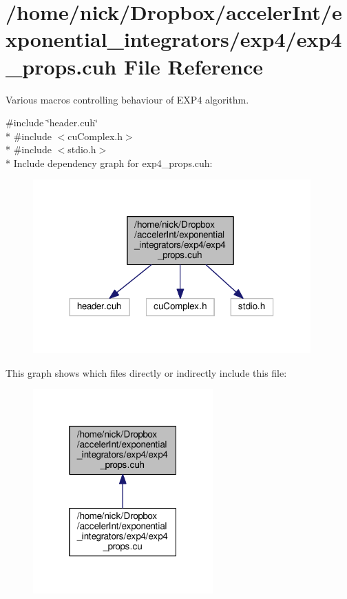 \hypertarget{exp4__props_8cuh}{}\section{/home/nick/\+Dropbox/acceler\+Int/exponential\+\_\+integrators/exp4/exp4\+\_\+props.cuh File Reference}
\label{exp4__props_8cuh}


Various macros controlling behaviour of E\+X\+P4 algorithm.  


{\ttfamily \#include \char`\"{}header.\+cuh\char`\"{}}\\*
{\ttfamily \#include $<$cu\+Complex.\+h$>$}\\*
{\ttfamily \#include $<$stdio.\+h$>$}\\*
Include dependency graph for exp4\+\_\+props.\+cuh\+:
\nopagebreak
\begin{figure}[H]
\begin{center}
\leavevmode
\includegraphics[width=302pt]{exp4__props_8cuh__incl}
\end{center}
\end{figure}
This graph shows which files directly or indirectly include this file\+:
\nopagebreak
\begin{figure}[H]
\begin{center}
\leavevmode
\includegraphics[width=196pt]{exp4__props_8cuh__dep__incl}
\end{center}
\end{figure}
